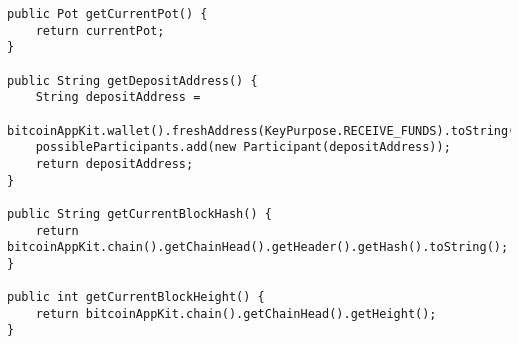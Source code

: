 \begin{lstlisting}[basicstyle=\small]
public Pot getCurrentPot() {
    return currentPot;
}

public String getDepositAddress() {
    String depositAddress =
        bitcoinAppKit.wallet().freshAddress(KeyPurpose.RECEIVE_FUNDS).toString();
    possibleParticipants.add(new Participant(depositAddress));
    return depositAddress;
}

public String getCurrentBlockHash() {
    return bitcoinAppKit.chain().getChainHead().getHeader().getHash().toString();
}

public int getCurrentBlockHeight() {
    return bitcoinAppKit.chain().getChainHead().getHeight();
}
\end{lstlisting}


